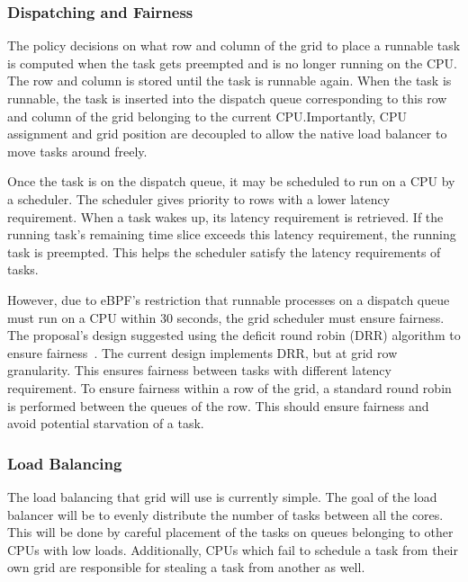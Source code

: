 \documentclass[letterpaper,twocolumn,10pt]{article}
\begin{document}
\subsubsection{Dispatching and Fairness}\label{sec:dispatching}

The policy decisions on what row and column of the grid to place a runnable task
is computed when the task gets preempted and is no longer running on the CPU.\@
The row and column is stored until the task is runnable again. When the task
is runnable, the task is inserted into the dispatch queue corresponding to this
row and column of the grid belonging to the current CPU.\@ Importantly, CPU
assignment and grid position are decoupled to allow the native load balancer
to move tasks around freely.

Once the task is on the dispatch queue, it may be scheduled to run on a CPU by a
scheduler. The scheduler gives priority to rows with a lower latency requirement.
When a task wakes up, its latency requirement is retrieved. If the running task's
remaining time slice exceeds this latency requirement, the running task is
preempted. This helps the scheduler satisfy the latency requirements of tasks.

However, due to eBPF's restriction that runnable processes on a dispatch queue must run
on a CPU within 30 seconds, the grid scheduler must ensure fairness. The proposal's
design suggested using the deficit round robin (DRR) algorithm to ensure 
fairness~\cite{DRR}. The current design implements DRR, but at grid row granularity. 
This ensures fairness between tasks with different latency requirement. To ensure
fairness within a row of the grid, a standard round robin is performed between
the queues of the row. This should ensure fairness and avoid potential starvation
of a task.

\subsubsection{Load Balancing}

The load balancing that grid will use is currently simple. The goal of the
load balancer will be to evenly distribute the number of tasks between all the
cores. This will be done by careful placement of the tasks on queues belonging
to other CPUs with low loads. Additionally, CPUs which fail to schedule a task
from their own grid are responsible for stealing a task from another as well.

\end{document}
